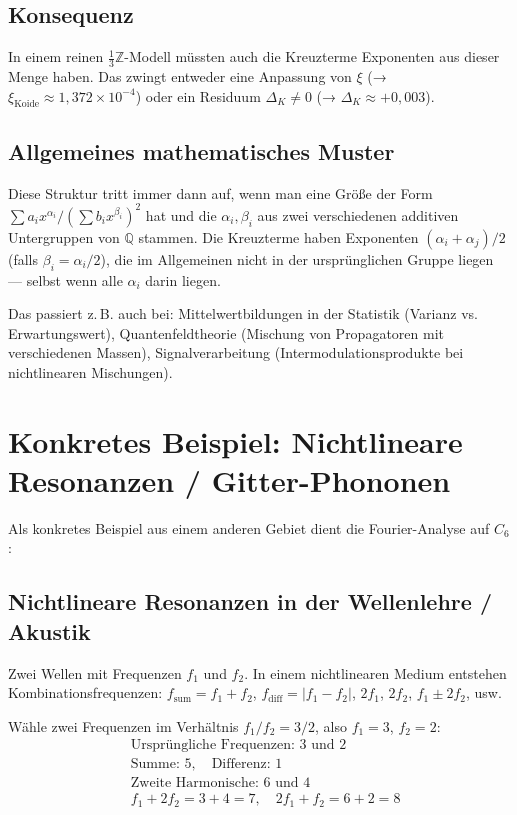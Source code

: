 \subsection{Konsequenz}

In einem reinen $\tfrac{1}{3}\mathbb{Z}$-Modell müssten auch die Kreuzterme
Exponenten aus dieser Menge haben. Das zwingt entweder eine Anpassung von $\xi$
(→ $\xi_{\text{Koide}}\approx1{,}372\times10^{-4}$)
oder ein Residuum $\Delta_K\neq0$ (→ $\Delta_K\approx+0{,}003$).

\subsection{Allgemeines mathematisches Muster}

Diese Struktur tritt immer dann auf, wenn man eine Größe der Form
$\sum a_ix^{\alpha_i}/(\sum b_ix^{\beta_i})^2$ hat
und die $\alpha_i,\beta_i$ aus zwei verschiedenen additiven Untergruppen
von $\mathbb{Q}$ stammen.
Die Kreuzterme haben Exponenten $(\alpha_i+\alpha_j)/2$
(falls $\beta_i=\alpha_i/2$), die im Allgemeinen nicht in der
ursprünglichen Gruppe liegen — selbst wenn alle $\alpha_i$ darin liegen.

Das passiert z.\,B. auch bei:
Mittelwertbildungen in der Statistik (Varianz vs. Erwartungswert),
Quantenfeldtheorie (Mischung von Propagatoren mit verschiedenen Massen),
Signalverarbeitung (Intermodulationsprodukte bei nichtlinearen Mischungen).

\section{Konkretes Beispiel: Nichtlineare Resonanzen / Gitter-Phononen}

Als konkretes Beispiel aus einem anderen Gebiet dient die Fourier-Analyse auf $C_6$:

\subsection{Nichtlineare Resonanzen in der Wellenlehre / Akustik}

Zwei Wellen mit Frequenzen $f_1$ und $f_2$.
In einem nichtlinearen Medium entstehen Kombinationsfrequenzen:
$f_{\text{sum}}=f_1+f_2$, $f_{\text{diff}}=|f_1-f_2|$,
$2f_1$, $2f_2$, $f_1\pm2f_2$, usw.

Wähle zwei Frequenzen im Verhältnis $f_1/f_2=3/2$, also $f_1=3$, $f_2=2$:
\begin{align*}
  &\text{Ursprüngliche Frequenzen: }3\text{ und }2 \\
  &\text{Summe: }5, \quad\text{Differenz: }1 \\
  &\text{Zweite Harmonische: }6\text{ und }4 \\
  &f_1+2f_2=3+4=7, \quad 2f_1+f_2=6+2=8
\end{align*}

